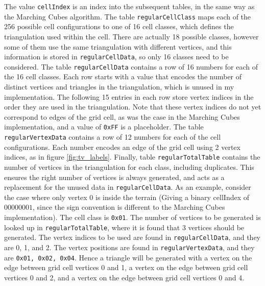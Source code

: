 \documentclass{article}
\begin{document}
The value \texttt{cellIndex} is an index into the subsequent tables, in the same way as the Marching Cubes algorithm. The table \texttt{regularCellClass} maps each of the 256 possible cell configurations to one of 16 cell classes, which defines the triangulation used within the cell. There are actually 18 possible classes, however some of them use the same triangulation with different vertices, and this information is stored in \texttt{regularCellData}, so only 16 classes need to be considered. The table \texttt{regularCellData} contains a row of 16 numbers for each of the 16 cell classes. Each row starts with a value that encodes the number of distinct vertices and triangles in the triangulation, which is unused in my implementation. The following 15 entries in each row store vertex indices in the order they are used in the triangulation. Note that these vertex indices do not yet correspond to edges of the grid cell, as was the case in the Marching Cubes implementation, and a value of \texttt{0xFF} is a placeholder. The table \texttt{regularVertexData} contains a row of 12 numbers for each of the cell configurations. Each number encodes an edge of the grid cell using 2 vertex indices, as in figure \ref{fig:tv_labels}. Finally, table \texttt{regularTotalTable} contains the number of vertices in the triangulation for each class, including duplicates. This ensures the right number of vertices is always generated, and acts as a replacement for the unused data in \texttt{regularCellData}. 
As an example, consider the case where only vertex 0 is inside the terrain (Giving a binary cellIndex of $00000001$, since the sign convention is different to the Marching Cubes implementation). The cell class is \texttt{0x01}. The number of vertices to be generated is looked up in \texttt{regularTotalTable}, where it is found that 3 vertices should be generated. The vertex indices to be used are found in \texttt{regularCellData}, and they are 0, 1, and 2. The vertex positions are found in \texttt{regularVertexData}, and they are \texttt{0x01, 0x02, 0x04}. Hence a triangle will be generated with a vertex on the edge between grid cell vertices 0 and 1, a vertex on the edge between grid cell vertices 0 and 2, and a vertex on the edge between grid cell vertices 0 and 4.
\end{document}
